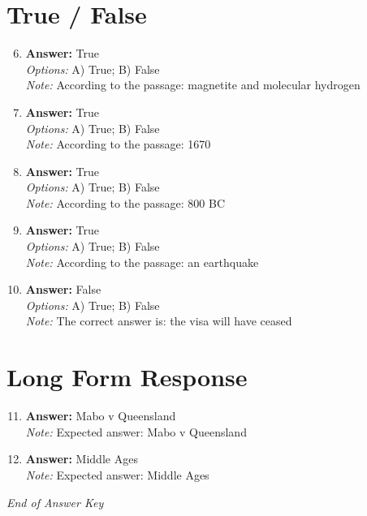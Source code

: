 \documentclass[12pt]{article}
\begin{document}
\section*{True / False}
\begin{enumerate}[label=\arabic*.]
\setcounter{enumi}{5}
\item \textbf{Answer:} True
\\ \textit{Options:} A) True; B) False
\\ \textit{Note:} According to the passage: magnetite and molecular hydrogen
\item \textbf{Answer:} True
\\ \textit{Options:} A) True; B) False
\\ \textit{Note:} According to the passage: 1670
\item \textbf{Answer:} True
\\ \textit{Options:} A) True; B) False
\\ \textit{Note:} According to the passage: 800 BC
\item \textbf{Answer:} True
\\ \textit{Options:} A) True; B) False
\\ \textit{Note:} According to the passage: an earthquake
\item \textbf{Answer:} False
\\ \textit{Options:} A) True; B) False
\\ \textit{Note:} The correct answer is: the visa will have ceased
\end{enumerate}

\section*{Long Form Response}
\begin{enumerate}[label=\arabic*.]
\setcounter{enumi}{10}
\item \textbf{Answer:} Mabo v Queensland
\\ \textit{Note:} Expected answer: Mabo v Queensland
\item \textbf{Answer:} Middle Ages
\\ \textit{Note:} Expected answer: Middle Ages
\end{enumerate}

\vfill
\noindent\textit{End of Answer Key}
\end{document}
